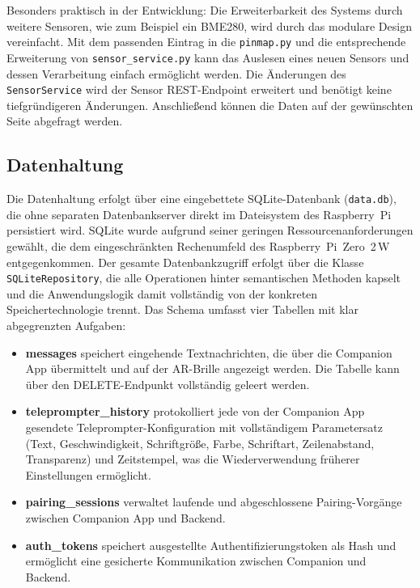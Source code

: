 Besonders praktisch in der Entwicklung: Die Erweiterbarkeit des Systems durch weitere Sensoren, wie zum Beispiel ein BME280, wird durch das modulare Design vereinfacht. Mit dem passenden Eintrag in die \texttt{pinmap.py} und die entsprechende Erweiterung von \texttt{sensor\_service.py} kann das Auslesen eines neuen Sensors und dessen Verarbeitung einfach ermöglicht werden. Die Änderungen des \texttt{SensorService} wird der Sensor REST-Endpoint erweitert und benötigt keine tiefgründigeren Änderungen. Anschließend können die Daten auf der gewünschten Seite abgefragt werden.

\subsection{Datenhaltung}
\label{subsec:datenbankImpl}

Die Datenhaltung erfolgt über eine eingebettete SQLite-Datenbank
(\texttt{data.db}), die ohne separaten Datenbankserver direkt im Dateisystem
des Raspberry~Pi persistiert wird.
SQLite wurde aufgrund seiner geringen Ressourcenanforderungen gewählt, die dem
eingeschränkten Rechenumfeld des Raspberry~Pi~Zero~2\,W entgegenkommen.
Der gesamte Datenbankzugriff erfolgt über die Klasse \texttt{SQLiteRepository},
die alle Operationen hinter semantischen Methoden kapselt und die
Anwendungslogik damit vollständig von der konkreten Speichertechnologie trennt.
Das Schema umfasst vier Tabellen mit klar abgegrenzten Aufgaben: 

\begin{itemize}
  \item \textbf{messages} speichert eingehende Textnachrichten, die über
    die Companion App übermittelt und auf der AR-Brille angezeigt werden.
    Die Tabelle kann über den DELETE-Endpunkt vollständig geleert werden.
  \item \textbf{teleprompter\_history} protokolliert jede von der Companion App
    gesendete Teleprompter-Konfiguration mit vollständigem Parametersatz
    (Text, Geschwindigkeit, Schriftgröße, Farbe, Schriftart, Zeilenabstand,
    Transparenz) und Zeitstempel, was die Wiederverwendung früherer Einstellungen
    ermöglicht.
  \item \textbf{pairing\_sessions} verwaltet laufende und abgeschlossene
    Pairing-Vorgänge zwischen Companion App und Backend.
  \item \textbf{auth\_tokens} speichert ausgestellte Authentifizierungstoken
    als Hash und ermöglicht eine gesicherte Kommunikation
    zwischen Companion und Backend.
\end{itemize}

